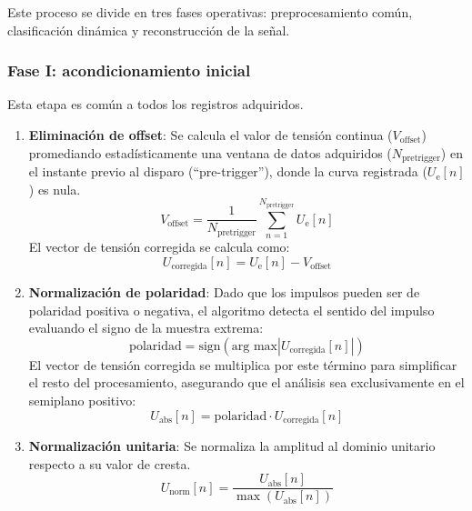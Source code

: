 Este proceso se divide en tres fases operativas: preprocesamiento común, clasificación dinámica y reconstrucción de la señal.

\subsubsection{Fase I: acondicionamiento inicial}

Esta etapa es común a todos los registros adquiridos.
\begin{enumerate}
    \item \textbf{Eliminación de offset}: Se calcula el valor de tensión continua ($V_{\text{offset}}$) promediando estadísticamente una ventana de datos adquiridos ($N_{\text{pretrigger}}$) en el instante previo al disparo (``pre-trigger''), donde la curva registrada ($U_\text{e}[n]$) es nula.
    \begin{equation}
        \label{eq:calculo_offset}
        V_{\text{offset}} = \frac{1}{N_{\text{pretrigger}}} \sum_{n=1}^{N_{\text{pretrigger}}} U_\text{e}[n]
    \end{equation}
    El vector de tensión corregida se calcula como:
    \begin{equation}
        \label{eq:eliminacion_offset}
        U_{\text{corregida}}[n] = U_\text{e}[n] - V_{\text{offset}}
    \end{equation}
    \item \textbf{Normalización de polaridad}: Dado que los impulsos pueden ser de polaridad positiva o negativa, el algoritmo detecta el sentido del impulso evaluando el signo de la muestra extrema:
    \begin{equation}
        \label{eq:buscar_polaridad}
        \text{polaridad} = \text{sign}(\text{arg max} |U_{\text{corregida}}[n]|)
    \end{equation}
    El vector de tensión corregida se multiplica por este término para simplificar el resto del procesamiento, asegurando que el análisis sea exclusivamente en el semiplano positivo:
    \begin{equation}
        \label{eq:normalizacion_polaridad}
        U_{\text{abs}}[n] = \text{polaridad} \cdot U_{\text{corregida}}[n]
    \end{equation}
    \item \textbf{Normalización unitaria}: Se normaliza la amplitud al dominio unitario respecto a su valor de cresta.
    \begin{equation}
        \label{eq:onda_normalizada}
        U_{\text{norm}}[n] = \frac{U_{\text{abs}}[n]}{\max(U_{\text{abs}}[n])}
    \end{equation}
\end{enumerate}

